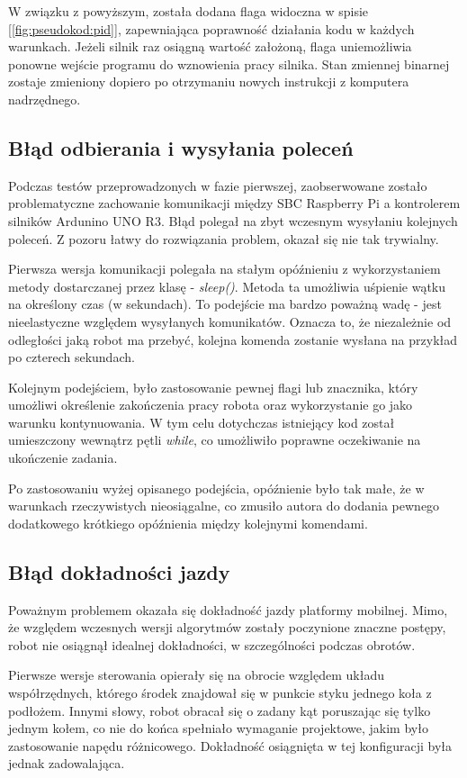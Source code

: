 W związku z powyższym, została dodana flaga widoczna w spisie [\ref{fig:pseudokod:pid}], zapewniająca poprawność działania kodu w każdych warunkach. Jeżeli silnik raz osiągną wartość założoną, flaga uniemożliwia ponowne wejście programu do wznowienia pracy silnika. Stan zmiennej binarnej zostaje zmieniony dopiero po otrzymaniu nowych instrukcji z komputera nadrzędnego. 

\subsection{Błąd odbierania i wysyłania poleceń}
Podczas testów przeprowadzonych w fazie pierwszej, zaobserwowane zostało problematyczne zachowanie komunikacji między SBC Raspberry Pi a kontrolerem silników Ardunino UNO R3. Błąd polegał na zbyt wczesnym wysyłaniu kolejnych poleceń. Z pozoru łatwy do rozwiązania problem, okazał się nie tak trywialny. 

Pierwsza wersja komunikacji polegała na stałym opóźnieniu z wykorzystaniem metody dostarczanej przez klasę  - \textit{sleep()}. Metoda ta umożliwia uśpienie wątku na określony czas (w sekundach). To podejście ma bardzo poważną wadę - jest nieelastyczne względem wysyłanych komunikatów. Oznacza to, że niezależnie od odległości jaką robot ma przebyć, kolejna komenda zostanie wysłana na przykład po czterech sekundach. 

Kolejnym podejściem, było zastosowanie pewnej flagi lub znacznika, który umożliwi określenie zakończenia pracy robota oraz wykorzystanie go jako warunku kontynuowania. W tym celu dotychczas istniejący kod został umieszczony wewnątrz pętli \textit{while}, co umożliwiło poprawne oczekiwanie na ukończenie zadania. 

Po zastosowaniu wyżej opisanego podejścia, opóźnienie było tak małe, że w warunkach rzeczywistych nieosiągalne, co zmusiło autora do dodania pewnego dodatkowego krótkiego opóźnienia między kolejnymi komendami. 

\subsection{Błąd dokładności jazdy}

Poważnym problemem okazała się dokładność jazdy platformy mobilnej. Mimo, że względem wczesnych wersji algorytmów zostały poczynione znaczne postępy, robot nie osiągnął idealnej dokładności, w szczególności podczas obrotów. 

Pierwsze wersje sterowania opierały się na obrocie względem układu współrzędnych, którego środek znajdował się w punkcie styku jednego koła z podłożem. Innymi słowy, robot obracał się o zadany kąt poruszając się tylko jednym kołem, co nie do końca spełniało wymaganie projektowe, jakim było zastosowanie napędu różnicowego. Dokładność osiągnięta w tej konfiguracji była jednak zadowalająca. 

